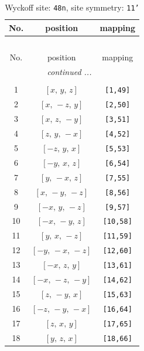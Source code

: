 \documentclass[fleqn,8pt]{jsarticle}
\begin{document}
\renewcommand{\arraystretch}{1.2}
\begin{longtable}{ccc}
\caption{Wyckoff site: {\tt 48n}, site symmetry: {\tt 11'}}
 \\
 \hline \hline
No. & position & mapping \\ \hline \endfirsthead

\multicolumn{2}{l}{\tablename\ \thetable{}} \\
 \hline \hline
No. & position & mapping \\ \hline \endhead

 \hline \hline
\multicolumn{2}{r}{\footnotesize\it continued ...} \\ \endfoot

 \hline \hline
\multicolumn{2}{r}{} \\ \endlastfoot

1 & $\left[ x,\, y,\, z \right]$ & {\tt [1,49]} \\ \hline
2 & $\left[ x,\, - z,\, y \right]$ & {\tt [2,50]} \\ \hline
3 & $\left[ x,\, z,\, - y \right]$ & {\tt [3,51]} \\ \hline
4 & $\left[ z,\, y,\, - x \right]$ & {\tt [4,52]} \\ \hline
5 & $\left[ - z,\, y,\, x \right]$ & {\tt [5,53]} \\ \hline
6 & $\left[ - y,\, x,\, z \right]$ & {\tt [6,54]} \\ \hline
7 & $\left[ y,\, - x,\, z \right]$ & {\tt [7,55]} \\ \hline
8 & $\left[ x,\, - y,\, - z \right]$ & {\tt [8,56]} \\ \hline
9 & $\left[ - x,\, y,\, - z \right]$ & {\tt [9,57]} \\ \hline
10 & $\left[ - x,\, - y,\, z \right]$ & {\tt [10,58]} \\ \hline
11 & $\left[ y,\, x,\, - z \right]$ & {\tt [11,59]} \\ \hline
12 & $\left[ - y,\, - x,\, - z \right]$ & {\tt [12,60]} \\ \hline
13 & $\left[ - x,\, z,\, y \right]$ & {\tt [13,61]} \\ \hline
14 & $\left[ - x,\, - z,\, - y \right]$ & {\tt [14,62]} \\ \hline
15 & $\left[ z,\, - y,\, x \right]$ & {\tt [15,63]} \\ \hline
16 & $\left[ - z,\, - y,\, - x \right]$ & {\tt [16,64]} \\ \hline
17 & $\left[ z,\, x,\, y \right]$ & {\tt [17,65]} \\ \hline
18 & $\left[ y,\, z,\, x \right]$ & {\tt [18,66]} \\ \hline

\end{longtable}
\end{document}
